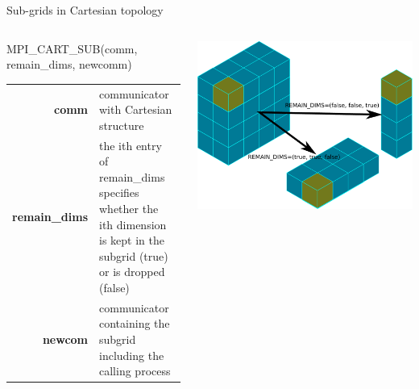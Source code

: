 \documentclass[aspectratio=43]{beamer}
\begin{document}
\begin{frame}[fragile]{Sub-grids in Cartesian topology}
\begin{columns}
\begin{column}{0.5\paperwidth}
\begin{Fortranlisting}[]{}
MPI_CART_SUB(comm, remain_dims, newcomm)
\end{Fortranlisting}
\begin{black1block}{}
\begin{tabular}{rp{3cm}}
\textbf{comm} & communicator with Cartesian structure\\
\textbf{remain\_dims} & the ith entry of remain\_dims specifies whether the ith dimension is kept in the subgrid (true) or is dropped (false)\\
\textbf{newcom} & communicator containing the subgrid including the calling process\\
\end{tabular}
\end{black1block}
\end{column}
\begin{column}{0.49\paperwidth}
\includegraphics[scale=0.29]{05.MPI_Topo/subgrid.pdf}
\end{column}
\end{columns}
\end{frame}
\end{document}
